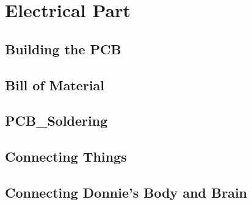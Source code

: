 \chapter{Electrical Part}

\section{Building the PCB}
\label{sec:pcb}

\section{Bill of Material}
\label{sec:bom}

\section{PCB_Soldering}
\label{sec:solder}

\section{Connecting Things}
\label{sec:connect}

\section{Connecting Donnie's Body and Brain}
\label{sec:connect2}

